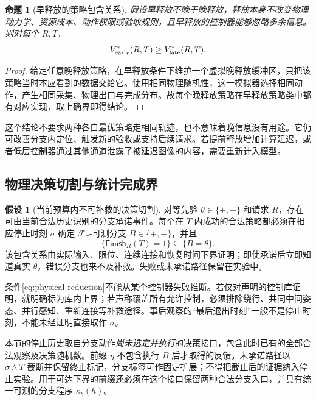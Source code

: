 \documentclass[11pt,a4paper,fontset=fandol]{ctexart}
\newtheorem{proposition}[theorem]{命题}
\theoremstyle{definition}
\newtheorem{assumption}[theorem]{假设}
\theoremstyle{remark}
\numberwithin{equation}{section}
\newcommand{\cF}{\mathcal F}
\newcommand{\Finish}{\mathsf{Finish}}
\begin{document}
\begin{proposition}[早释放的策略包含关系]
\label{prop:release}
假设早释放不晚于晚释放，释放本身不改变物理动力学、资源成本、动作权限或验收规则，且早释放的控制器能够忽略多余信息。则对每个 $R,T$，
\begin{equation}
 V^*_{\rm early}(R,T)\ge V^*_{\rm late}(R,T).
 \label{eq:release-order}
\end{equation}
\end{proposition}
\begin{proof}
给定任意晚释放策略，在早释放条件下维护一个虚拟晚释放缓冲区，只把该策略当时本应看到的数据交给它。使用相同物理随机性，这一模拟器选择相同动作，产生相同采集、物理出口与完成分布。故每个晚释放策略在早释放策略类中都有对应实现，取上确界即得结论。
\end{proof}
这个结论不要求两种各自最优策略走相同轨迹，也不意味着晚信息没有用途。它仍可改善分支内定位、触发新的验收或支持后续请求。若提前释放增加计算延迟，或者低层控制器通过其他通道泄露了被延迟图像的内容，需要重新计入模型。

\subsection{物理决策切割与统计完成界}
\begin{assumption}[当前预算内不可补救的决策切割]
\label{ass:cut}
对等先验 $\theta\in\{+,-\}$ 和请求 $R$，存在可由当前合法历史识别的分支承诺事件。每个在 $T$ 内成功的合法策略都必须在相应停止时刻 $\sigma$ 确定 $\cF_\sigma$-可测分支 $B\in\{+,-\}$，并且
\begin{equation}
 \{\Finish_R(T)=1\}\subseteq\{B=\theta\}.
 \label{eq:physical-reduction}
\end{equation}
该包含关系由实际输入、限位、连续连接和恢复时间下界证明；即使承诺后立即知道真实 $\theta$，错误分支也来不及补救。失败或未承诺路径保留在实验中。
\end{assumption}

条件\eqref{eq:physical-reduction}不能从某个控制器失败推断。若仅对声明的控制库证明，就明确标为库内上界；若声称覆盖所有允许控制，必须排除绕行、共同中间姿态、并行感知、重新连接等补救途径。事后观察的“最后退出时刻”一般不是停止时刻，不能未经证明直接取作 $\sigma$。

本节的停止历史取自分支动作\emph{尚未选定并执行}的决策接口，包含此时已有的全部合法观察及决策随机数。前缀 $\eta$ 不包含执行 $B$ 后才取得的反馈。未承诺路径以 $\sigma\wedge T$ 截断并保留终止标记，分支标签可作固定扩展；不得把截止后的证据纳入停止实验。用于可达下界的前缀还必须在这个接口保留两种合法分支入口，并具有统一可测的分支程序 $\kappa_b(h)$。
\end{document}
